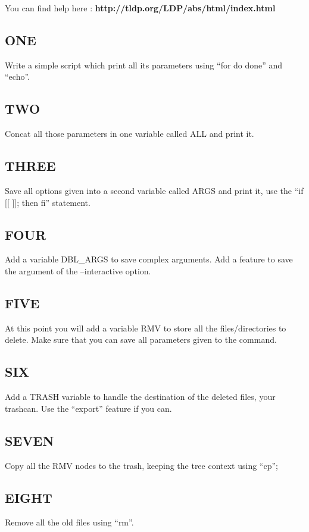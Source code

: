 You can find help here : \textbf{http://tldp.org/LDP/abs/html/index.html}

\subsection{ONE}
Write a simple script which print all its parameters using ``for do done'' and ``echo''.

\subsection{TWO}
Concat all those parameters in one variable called ALL and print it.

\subsection{THREE}
Save all options given into a second variable called ARGS and print it, use the ``if [[ ]]; then fi'' statement.

\subsection{FOUR}
Add a variable DBL\_ARGS  to save complex arguments.
Add a feature to save the argument of the --interactive option.

\subsection{FIVE}
At this point you will add a variable RMV to store all the files/directories to delete.
Make sure that you can save all parameters given to the command.

\subsection{SIX}
Add a TRASH variable to handle the destination of the deleted files, your trashcan.
Use the ``export'' feature if you can.

\subsection{SEVEN}
Copy all the RMV nodes to the trash, keeping the tree context using ``cp'';

\subsection{EIGHT}
Remove all the old files using ``rm''.

